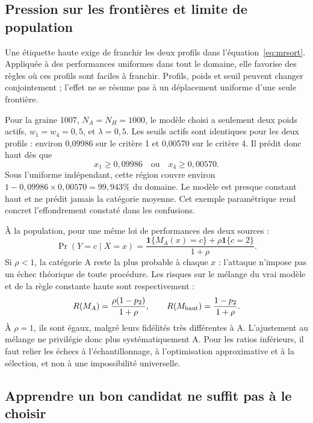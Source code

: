 \documentclass[11pt,a4paper]{article}
\newcommand{\ind}{\mathbf{1}}
\begin{document}
\subsection{Pression sur les frontières et limite de population}

Une étiquette haute exige de franchir les deux profils dans
l'équation~\eqref{eq:mrsort}. Appliquée à des performances uniformes dans tout
le domaine, elle favorise des règles où ces profils sont faciles à franchir.
Profils, poids et seuil peuvent changer conjointement ; l'effet ne se résume
pas à un déplacement uniforme d'une seule frontière.

Pour la graine 1007, $N_A=N_H=1000$, le modèle choisi a seulement deux poids
actifs, $w_1=w_4=0,5$, et $\lambda=0,5$. Les seuils actifs sont identiques pour
les deux profils : environ 0,09986 sur le critère 1 et 0,00570 sur le critère 4.
Il prédit donc haut dès que
\[
 x_1\geq0,09986\quad\text{ou}\quad x_4\geq0,00570.
\]
Sous l'uniforme indépendant, cette région couvre environ
$1-0,09986\times0,00570=99,943\%$ du domaine. Le modèle est presque constant
haut et ne prédit jamais la catégorie moyenne. Cet exemple paramétrique rend
concret l'effondrement constaté dans les confusions.

À la population, pour une même loi de performances des deux sources :
\begin{equation}
 \Pr(Y=c\mid X=x)=\frac{\ind\{M_A(x)=c\}+\rho\ind\{c=2\}}{1+\rho}.
 \label{eq:contamination}
\end{equation}
Si $\rho<1$, la catégorie A reste la plus probable à chaque $x$ : l'attaque
n'impose pas un échec théorique de toute procédure. Les risques sur le mélange
du vrai modèle et de la règle constante haute sont respectivement :
\[
 R(M_A)=\frac{\rho(1-p_2)}{1+\rho},\qquad
 R(M_{\rm haut})=\frac{1-p_2}{1+\rho}.
\]
À $\rho=1$, ils sont égaux, malgré leurs fidélités très différentes à A.
L'ajustement au mélange ne privilégie donc plus systématiquement A. Pour les
ratios inférieurs, il faut relier les échecs à l'échantillonnage, à l'optimisation
approximative et à la sélection, et non à une impossibilité universelle.

\subsection{Apprendre un bon candidat ne suffit pas à le choisir}
\end{document}
